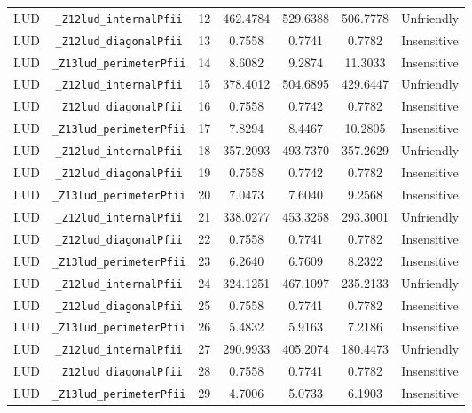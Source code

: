 \documentclass{article}
\begin{document}
\begin{table}[H]
\begin{tabular}{c c c c c c c}
LUD & \verb|_Z12lud_internalPfii|                    & 12 & 462.4784  & 529.6388 &  506.7778 & Unfriendly\\
LUD & \verb|_Z12lud_diagonalPfii|                    & 13 & 0.7558    & 0.7741   &    0.7782 & Insensitive\\
LUD & \verb|_Z13lud_perimeterPfii|                   & 14 & 8.6082    & 9.2874   &   11.3033 & Insensitive\\
LUD & \verb|_Z12lud_internalPfii|                    & 15 & 378.4012  & 504.6895 &  429.6447 & Unfriendly\\
LUD & \verb|_Z12lud_diagonalPfii|                    & 16 & 0.7558    & 0.7742   &    0.7782 & Insensitive\\
LUD & \verb|_Z13lud_perimeterPfii|                   & 17 & 7.8294    & 8.4467   &   10.2805 & Insensitive\\
LUD & \verb|_Z12lud_internalPfii|                    & 18 & 357.2093  & 493.7370 &  357.2629 & Unfriendly\\
LUD & \verb|_Z12lud_diagonalPfii|                    & 19 & 0.7558    & 0.7742   &    0.7782 & Insensitive\\
LUD & \verb|_Z13lud_perimeterPfii|                   & 20 & 7.0473    & 7.6040   &    9.2568 & Insensitive\\
LUD & \verb|_Z12lud_internalPfii|                    & 21 & 338.0277  & 453.3258 &  293.3001 & Unfriendly\\
LUD & \verb|_Z12lud_diagonalPfii|                    & 22 & 0.7558    & 0.7741   &    0.7782 & Insensitive\\
LUD & \verb|_Z13lud_perimeterPfii|                   & 23 & 6.2640    & 6.7609   &    8.2322 & Insensitive\\
LUD & \verb|_Z12lud_internalPfii|                    & 24 & 324.1251  & 467.1097 &  235.2133 & Unfriendly\\
LUD & \verb|_Z12lud_diagonalPfii|                    & 25 & 0.7558    & 0.7741   &    0.7782 & Insensitive\\
LUD & \verb|_Z13lud_perimeterPfii|                   & 26 & 5.4832    & 5.9163   &    7.2186 & Insensitive\\
LUD & \verb|_Z12lud_internalPfii|                    & 27 & 290.9933  & 405.2074 &  180.4473 & Unfriendly\\
LUD & \verb|_Z12lud_diagonalPfii|                    & 28 & 0.7558    & 0.7741   &    0.7782 & Insensitive\\
LUD & \verb|_Z13lud_perimeterPfii|                   & 29 & 4.7006    & 5.0733   &    6.1903 & Insensitive\\

\end{tabular}
\end{table}
\end{document}
